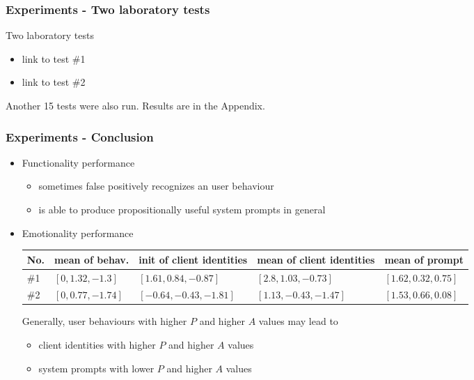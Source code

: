 \documentclass{beamer}
\begin{document}
\begin{frame}
\frametitle{Experiments - Two laboratory tests}
Two laboratory tests
\begin{itemize}
\item link to test \#1
\item link to test \#2
\end{itemize}
\vspace{.3cm}
Another 15 tests were also run. Results are in the Appendix.
\end{frame}

\begin{frame}
\frametitle{Experiments - Conclusion}
\begin{itemize}
\item Functionality performance
\begin{itemize}
\item sometimes false positively recognizes an user behaviour
\item is able to produce propositionally useful system prompts in general
\end{itemize}
\item Emotionality performance
\begin{table}
\scriptsize
\centering
\begin{tabular}{|  p{0.3cm} | p{1.8cm} |  p{2.5cm} |  p{2.5cm} | p{2cm} |}
\hline
No. & mean of behav. & init of client identities & mean of client identities & mean of prompt \\ \hline
\#1 & $[0,1.32,-1.3]$ & $[1.61,0.84,-0.87]$ &  $[2.8,1.03,-0.73]$ & $[1.62,0.32,0.75]$ \\ \hline
\#2 & $[0,0.77,-1.74]$ & $[-0.64,-0.43,-1.81]$ & $[1.13,-0.43,-1.47]$ & $[1.53,0.66,0.08]$ \\ \hline
\end{tabular}
\end{table}
\vspace{.3cm}
Generally, user behaviours with higher $P$ and higher $A$ values may lead to
\begin{itemize}
\item client identities with higher $P$ and higher $A$ values
\item system prompts with lower $P$ and higher $A$ values
\end{itemize}
\end{itemize}
\end{frame}
\end{document}
